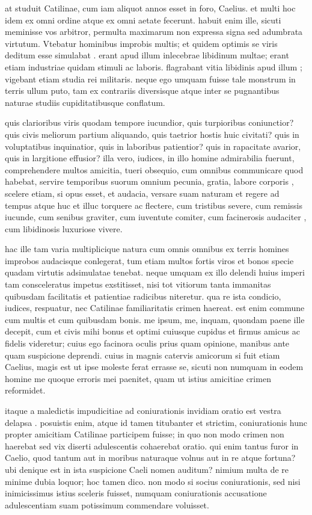  at studuit Catilinae, cum iam aliquot annos esset in foro, Caelius. et multi hoc idem ex omni ordine atque ex omni aetate fecerunt. habuit enim ille, sicuti meminisse vos arbitror, permulta maximarum non expressa signa sed adumbrata virtutum. Vtebatur hominibus improbis multis; et quidem optimis se viris deditum esse simulabat . erant apud illum inlecebrae libidinum multae; erant etiam industriae quidam stimuli ac laboris. flagrabant vitia libidinis apud illum ; vigebant etiam studia rei militaris. neque ego umquam fuisse tale monstrum in terris ullum puto, tam ex contrariis diversisque atque inter se pugnantibus naturae studiis cupiditatibusque conflatum.

 quis clarioribus viris quodam tempore iucundior, quis turpioribus coniunctior? quis civis meliorum partium aliquando, quis taetrior hostis huic civitati? quis in voluptatibus inquinatior, quis in laboribus patientior? quis in rapacitate avarior, quis in largitione effusior? illa vero, iudices, in illo homine admirabilia fuerunt, comprehendere multos amicitia, tueri obsequio, cum omnibus communicare quod habebat, servire temporibus suorum omnium pecunia, gratia, labore corporis , scelere etiam, si opus esset, et audacia, versare suam naturam et regere ad tempus atque huc et illuc torquere ac flectere, cum tristibus severe, cum remissis iucunde, cum senibus graviter, cum iuventute comiter, cum facinerosis audaciter , cum libidinosis luxuriose vivere.

 hac ille tam varia multiplicique natura cum omnis omnibus ex terris homines improbos audacisque conlegerat, tum etiam multos fortis viros et bonos specie quadam virtutis adsimulatae tenebat. neque umquam ex illo delendi huius imperi tam consceleratus impetus exstitisset, nisi tot vitiorum tanta immanitas quibusdam facilitatis et patientiae radicibus niteretur. qua re ista condicio, iudices, respuatur, nec Catilinae familiaritatis crimen haereat. est enim commune cum multis et cum quibusdam bonis. me ipsum, me, inquam, quondam paene ille decepit, cum et civis mihi bonus et optimi cuiusque cupidus et firmus amicus ac fidelis videretur; cuius ego facinora oculis prius quam opinione, manibus ante quam suspicione deprendi. cuius in magnis catervis amicorum si fuit etiam Caelius, magis est ut ipse moleste ferat errasse se, sicuti non numquam in eodem homine me quoque erroris mei paenitet, quam ut istius amicitiae crimen reformidet.

 itaque a maledictis impudicitiae ad coniurationis invidiam oratio est vestra delapsa . posuistis enim, atque id tamen titubanter et strictim, coniurationis hunc propter amicitiam Catilinae participem fuisse; in quo non modo crimen non haerebat sed vix diserti adulescentis cohaerebat oratio. qui enim tantus furor in Caelio, quod tantum aut in moribus naturaque volnus aut in re atque fortuna? ubi denique est in ista suspicione Caeli nomen auditum? nimium multa de re minime dubia loquor; hoc tamen dico. non modo si socius coniurationis, sed nisi inimicissimus istius sceleris fuisset, numquam coniurationis accusatione adulescentiam suam potissimum commendare voluisset.

